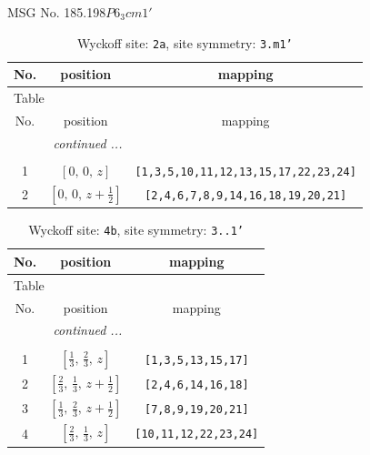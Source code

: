 \documentclass[fleqn,8pt]{jsarticle}
\begin{document}
\setcounter{MaxMatrixCols}{32}

\renewcommand{\tablename}{Table~}
\renewcommand{\figurename}{Figure~}
\begin{center}
\LARGE
MSG No. 185.198\quad$P6_{3}cm1'$
\end{center}
\renewcommand{\arraystretch}{1.2}
\begin{longtable}{ccc}
\caption{Wyckoff site: {\tt 2a}, site symmetry: {\tt 3.m1'}}
 \\
 \hline \hline
No. & position & mapping \\ \hline \endfirsthead

\multicolumn{2}{l}{\tablename\ \thetable{}} \\
 \hline \hline
No. & position & mapping \\ \hline \endhead

 \hline \hline
\multicolumn{2}{r}{\footnotesize\it continued ...} \\ \endfoot

 \hline \hline
\multicolumn{2}{r}{} \\ \endlastfoot

1 & $\left[ 0,\, 0,\, z \right]$ & {\tt [1,3,5,10,11,12,13,15,17,22,23,24]} \\ \hline
2 & $\left[ 0,\, 0,\, z + \frac{1}{2} \right]$ & {\tt [2,4,6,7,8,9,14,16,18,19,20,21]} \\
\end{longtable}
\renewcommand{\arraystretch}{1.2}
\begin{longtable}{ccc}
\caption{Wyckoff site: {\tt 4b}, site symmetry: {\tt 3..1'}}
 \\
 \hline \hline
No. & position & mapping \\ \hline \endfirsthead

\multicolumn{2}{l}{\tablename\ \thetable{}} \\
 \hline \hline
No. & position & mapping \\ \hline \endhead

 \hline \hline
\multicolumn{2}{r}{\footnotesize\it continued ...} \\ \endfoot

 \hline \hline
\multicolumn{2}{r}{} \\ \endlastfoot

1 & $\left[ \frac{1}{3},\, \frac{2}{3},\, z \right]$ & {\tt [1,3,5,13,15,17]} \\ \hline
2 & $\left[ \frac{2}{3},\, \frac{1}{3},\, z + \frac{1}{2} \right]$ & {\tt [2,4,6,14,16,18]} \\ \hline
3 & $\left[ \frac{1}{3},\, \frac{2}{3},\, z + \frac{1}{2} \right]$ & {\tt [7,8,9,19,20,21]} \\ \hline
4 & $\left[ \frac{2}{3},\, \frac{1}{3},\, z \right]$ & {\tt [10,11,12,22,23,24]} \\
\end{longtable}
\end{document}
